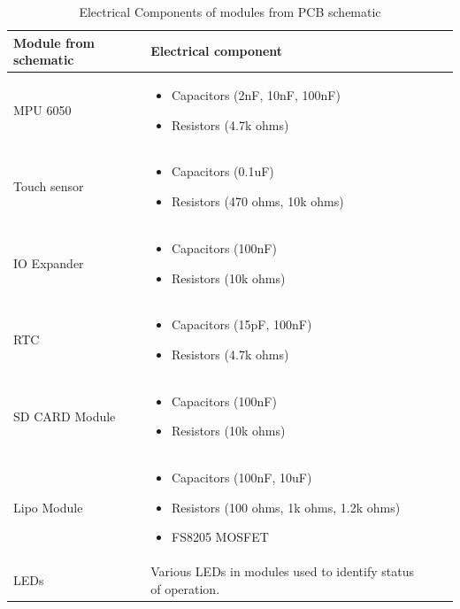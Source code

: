 \documentclass[12pt, titlepage]{article}
\begin{document}
\begin{table}[H]
	\begin{tabularx}{1.05\textwidth} { 
		  | >{\centering\arraybackslash}X 
		  | >{\centering\arraybackslash}X 
		  | >{\centering\arraybackslash}X 
		  | >{\centering\arraybackslash}X | }
		 \hline
		 \textbf{Module from schematic} & \textbf{Electrical component}\\
		\hline
		 MPU 6050  & \begin{itemize}
						\item{Capacitors (2nF, 10nF, 100nF)}
						\item{Resistors (4.7k ohms)}
					\end{itemize}\\
		\hline
		 Touch sensor  & \begin{itemize}
						\item{Capacitors (0.1uF)}
						\item{Resistors (470 ohms, 10k ohms)}
					\end{itemize}\\
		 \hline
		 IO Expander   & \begin{itemize}
						\item{Capacitors (100nF)}
						\item{Resistors (10k ohms)}
					\end{itemize}\\
		 \hline
		 RTC  & \begin{itemize}
						\item{Capacitors (15pF, 100nF)}
						\item{Resistors (4.7k ohms)}
					\end{itemize}\\
		 \hline
		 SD CARD Module   & \begin{itemize}
						\item{Capacitors (100nF)}
						\item{Resistors (10k ohms)}
					\end{itemize}\\
		 \hline
		 Lipo Module  & \begin{itemize}
						\item{Capacitors (100nF, 10uF)}
						\item{Resistors (100 ohms, 1k ohms, 1.2k ohms)}
						\item{FS8205 MOSFET}
					\end{itemize}\\
		 \hline
		 LEDs  & Various LEDs in modules used to identify status of operation.\\
		 \hline

	\end{tabularx}
\caption{\label{DesignElectrical}Electrical Components of modules from PCB schematic}  
\end{table}
\end{document}
